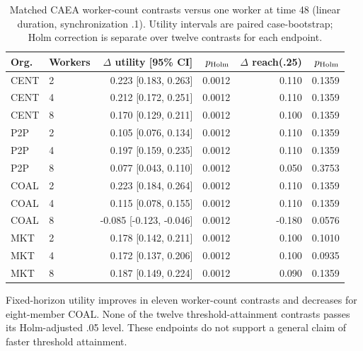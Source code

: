 \begin{table}[t]\centering\small

\caption{Matched CAEA worker-count contrasts versus one worker at time 48 (linear duration, synchronization .1). Utility intervals are paired case-bootstrap; Holm correction is separate over twelve contrasts for each endpoint.}

\begin{tabular}{llrrrr}\toprule Org. & Workers & $\Delta$ utility [95\% CI] & $p_{\rm Holm}$ & $\Delta$ reach(.25) & $p_{\rm Holm}$\\\midrule

CENT & 2 & 0.223 [0.183, 0.263] & 0.0012 & 0.110 & 0.1359\\

CENT & 4 & 0.212 [0.172, 0.251] & 0.0012 & 0.110 & 0.1359\\

CENT & 8 & 0.170 [0.129, 0.211] & 0.0012 & 0.100 & 0.1359\\

P2P & 2 & 0.105 [0.076, 0.134] & 0.0012 & 0.110 & 0.1359\\

P2P & 4 & 0.197 [0.159, 0.235] & 0.0012 & 0.110 & 0.1359\\

P2P & 8 & 0.077 [0.043, 0.110] & 0.0012 & 0.050 & 0.3753\\

COAL & 2 & 0.223 [0.184, 0.264] & 0.0012 & 0.110 & 0.1359\\

COAL & 4 & 0.115 [0.078, 0.155] & 0.0012 & 0.110 & 0.1359\\

COAL & 8 & -0.085 [-0.123, -0.046] & 0.0012 & -0.180 & 0.0576\\

MKT & 2 & 0.178 [0.142, 0.211] & 0.0012 & 0.100 & 0.1010\\

MKT & 4 & 0.172 [0.137, 0.206] & 0.0012 & 0.100 & 0.0935\\

MKT & 8 & 0.187 [0.149, 0.224] & 0.0012 & 0.090 & 0.1359\\

\bottomrule\end{tabular}\end{table}

Fixed-horizon utility improves in eleven worker-count contrasts and decreases for eight-member COAL. None of the twelve threshold-attainment contrasts passes its Holm-adjusted .05 level. These endpoints do not support a general claim of faster threshold attainment.

